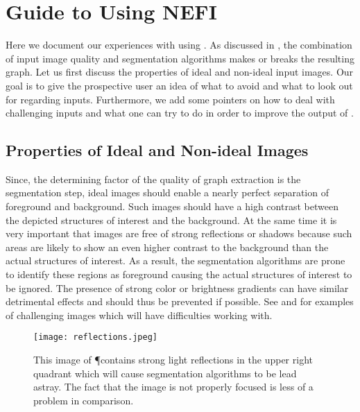 
\chapter{Guide to Using NEFI}\label{app:nefi}

	Here we document our experiences with using \NEFI. As discussed in , the combination of input image quality and \NEFIs segmentation algorithms makes or breaks the resulting graph. Let us first discuss the properties of ideal and non-ideal input images. Our goal is to give the prospective user an idea of what to avoid and what to look out for regarding inputs. Furthermore, we add some pointers on how to deal with challenging inputs and what one can try to do in order to improve the output of \NEFI. 

\section{Properties of Ideal and Non-ideal Images}

	Since, the determining factor of the quality of \NEFIs graph extraction is the segmentation step, ideal images should enable a nearly perfect separation of foreground and background. Such images should have a high contrast between the depicted structures of interest and the background. At the same time it is very important that images are free of strong reflections or shadows because such areas are likely to show an even higher contrast to the background than the actual structures of interest. As a result, the segmentation algorithms are prone to identify these regions as foreground causing the actual structures of interest to be ignored. The presence of strong color or brightness gradients can have similar detrimental effects and should thus be prevented if possible. See  and  for examples of challenging images which \NEFI will have difficulties working with.

	\begin{figure}
		\centering
		\texttt{[image: reflections.jpeg]}
		\caption[\NEFIs caveats - Reflections]{This image of \P contains strong light reflections in the upper right quadrant which will cause \NEFIs segmentation algorithms to be lead astray. The fact that the image is not properly focused is less of a problem in comparison.}
		\label{fig:sup:reflection}
	\end{figure}

